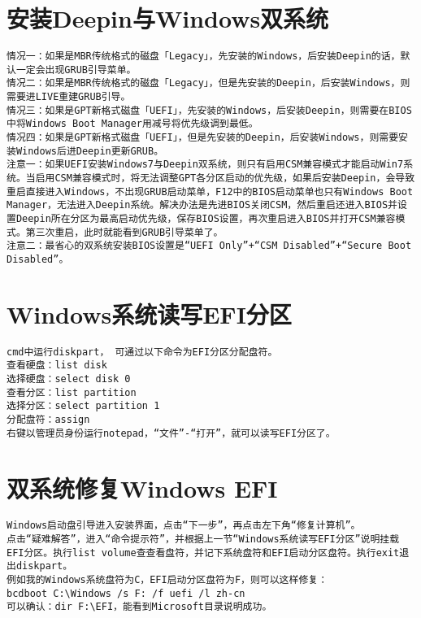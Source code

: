 \documentclass[a4paper,fontset=fandol,zihao=-4,linespread=1.2,oneside]{ctexbook}
\begin{document}
\section{安装Deepin与Windows双系统}
\begin{lstlisting}
情况一：如果是MBR传统格式的磁盘「Legacy」，先安装的Windows，后安装Deepin的话，默认一定会出现GRUB引导菜单。
情况二：如果是MBR传统格式的磁盘「Legacy」，但是先安装的Deepin，后安装Windows，则需要进LIVE重建GRUB引导。
情况三：如果是GPT新格式磁盘「UEFI」，先安装的Windows，后安装Deepin，则需要在BIOS中将Windows Boot Manager用减号将优先级调到最低。
情况四：如果是GPT新格式磁盘「UEFI」，但是先安装的Deepin，后安装Windows，则需要安装Windows后进Deepin更新GRUB。
注意一：如果UEFI安装Windows7与Deepin双系统，则只有启用CSM兼容模式才能启动Win7系统。当启用CSM兼容模式时，将无法调整GPT各分区启动的优先级，如果后安装Deepin，会导致重启直接进入Windows，不出现GRUB启动菜单，F12中的BIOS启动菜单也只有Windows Boot Manager，无法进入Deepin系统。解决办法是先进BIOS关闭CSM，然后重启还进入BIOS并设置Deepin所在分区为最高启动优先级，保存BIOS设置，再次重启进入BIOS并打开CSM兼容模式。第三次重启，此时就能看到GRUB引导菜单了。
注意二：最省心的双系统安装BIOS设置是“UEFI Only”+“CSM Disabled”+“Secure Boot Disabled”。
\end{lstlisting}

\section{Windows系统读写EFI分区}
\begin{lstlisting}
cmd中运行diskpart， 可通过以下命令为EFI分区分配盘符。
查看硬盘：list disk
选择硬盘：select disk 0
查看分区：list partition
选择分区：select partition 1
分配盘符：assign
右键以管理员身份运行notepad，“文件”-“打开”，就可以读写EFI分区了。
\end{lstlisting}

\section{双系统修复Windows EFI}
\begin{lstlisting}
Windows启动盘引导进入安装界面，点击“下一步”，再点击左下角“修复计算机”。
点击“疑难解答”，进入“命令提示符”，并根据上一节“Windows系统读写EFI分区”说明挂载EFI分区。执行list volume查查看盘符，并记下系统盘符和EFI启动分区盘符。执行exit退出diskpart。
例如我的Windows系统盘符为C，EFI启动分区盘符为F，则可以这样修复：
bcdboot C:\Windows /s F: /f uefi /l zh-cn
可以确认：dir F:\EFI，能看到Microsoft目录说明成功。
\end{lstlisting}
\end{document}
